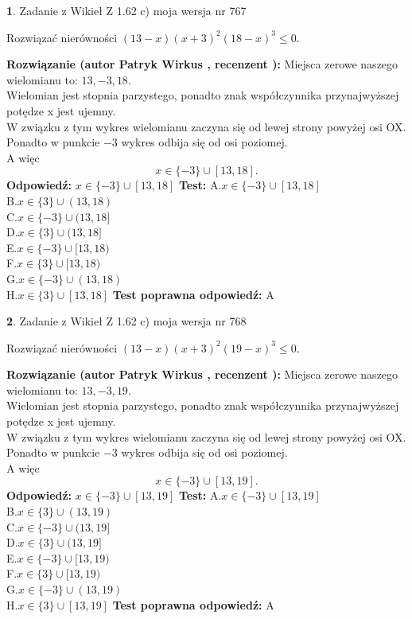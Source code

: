 \documentclass[12pt, a4paper]{article}
\theoremstyle{definition} %
\newtheorem{zad}{}
\newcommand{\zadStart}[1]{\begin{zad}#1\newline}
\newcommand{\zadStop}{\end{zad}}
\newcommand{\rozwStart}[2]{\noindent \textbf{Rozwiązanie (autor #1 , recenzent #2): }\newline}
\newcommand{\rozwStop}{\newline}
\newcommand{\odpStart}{\noindent \textbf{Odpowiedź:}\newline}
\newcommand{\odpStop}{\newline}
\newcommand{\testStart}{\noindent \textbf{Test:}\newline}
\newcommand{\testStop}{\newline}
\newcommand{\kluczStart}{\noindent \textbf{Test poprawna odpowiedź:}\newline}
\newcommand{\kluczStop}{\newline}
\begin{document}
\zadStart{Zadanie z Wikieł Z 1.62 c) moja wersja nr 767}

Rozwiązać nierówności $(13-x)(x+3)^{2}(18-x)^{3}\le0$.
\zadStop
\rozwStart{Patryk Wirkus}{}
Miejsca zerowe naszego wielomianu to: $13, -3, 18$.\\
Wielomian jest stopnia parzystego, ponadto znak współczynnika przy\linebreak najwyższej potędze x jest ujemny.\\ W związku z tym wykres wielomianu zaczyna się od lewej strony powyżej osi OX.\\
Ponadto w punkcie $-3$ wykres odbija się od osi poziomej.\\
A więc $$x \in \{-3\} \cup [13,18].$$
\rozwStop
\odpStart
$x \in \{-3\} \cup [13,18]$
\odpStop
\testStart
A.$x \in \{-3\} \cup [13,18]$\\
B.$x \in \{3\} \cup (13,18)$\\
C.$x \in \{-3\} \cup (13,18]$\\
D.$x \in \{3\} \cup (13,18]$\\
E.$x \in \{-3\} \cup [13,18)$\\
F.$x \in \{3\} \cup [13,18)$\\
G.$x \in \{-3\} \cup (13,18)$\\
H.$x \in \{3\} \cup [13,18]$
\testStop
\kluczStart
A
\kluczStop



\zadStart{Zadanie z Wikieł Z 1.62 c) moja wersja nr 768}

Rozwiązać nierówności $(13-x)(x+3)^{2}(19-x)^{3}\le0$.
\zadStop
\rozwStart{Patryk Wirkus}{}
Miejsca zerowe naszego wielomianu to: $13, -3, 19$.\\
Wielomian jest stopnia parzystego, ponadto znak współczynnika przy\linebreak najwyższej potędze x jest ujemny.\\ W związku z tym wykres wielomianu zaczyna się od lewej strony powyżej osi OX.\\
Ponadto w punkcie $-3$ wykres odbija się od osi poziomej.\\
A więc $$x \in \{-3\} \cup [13,19].$$
\rozwStop
\odpStart
$x \in \{-3\} \cup [13,19]$
\odpStop
\testStart
A.$x \in \{-3\} \cup [13,19]$\\
B.$x \in \{3\} \cup (13,19)$\\
C.$x \in \{-3\} \cup (13,19]$\\
D.$x \in \{3\} \cup (13,19]$\\
E.$x \in \{-3\} \cup [13,19)$\\
F.$x \in \{3\} \cup [13,19)$\\
G.$x \in \{-3\} \cup (13,19)$\\
H.$x \in \{3\} \cup [13,19]$
\testStop
\kluczStart
A
\kluczStop
\end{document}
